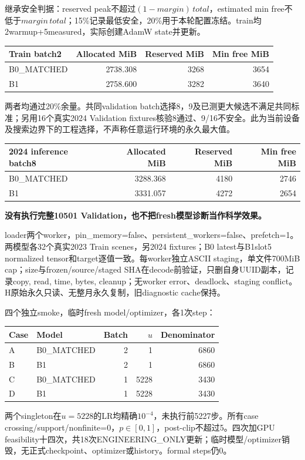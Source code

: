 \documentclass[10pt,a4paper,fontset=windows]{ctexart}
\begin{document}
继承安全判据：reserved peak不超过$(1-margin)\,total$，estimated min free不低于$margin\,total$；15\%记录最低安全，20\%用于本轮配置冻结。train均2warmup+5measured，实际创建AdamW state并更新。
\begin{center}\begin{tabular}{lrrr}\toprule
Train batch2 & Allocated MiB & Reserved MiB & Min free MiB\\\midrule
B0\_MATCHED & 2738.308 & 3268 & 3654 \\
B1 & 2758.600 & 3282 & 3640 \\
\bottomrule\end{tabular}\end{center}
两者均通过20\%余量。共同validation batch选择8，9及已测更大候选不满足共同标准；另用16个真实2024 Validation fixtures核验8通过、9/16不安全。此为当前设备及搜索边界下的工程选择，不声称任意运行环境的永久最大值。
\begin{center}\begin{tabular}{lrrr}\toprule
2024 inference batch8 & Allocated MiB & Reserved MiB & Min free MiB\\\midrule
B0\_MATCHED & 3288.368 & 4180 & 2746 \\
B1 & 3331.057 & 4272 & 2654 \\
\bottomrule\end{tabular}\end{center}
\textbf{没有执行完整10501 Validation，也不把fresh模型诊断当作科学效果。}\par
loader两个worker，pin\_memory=false、persistent\_workers=false、prefetch=1。两模型各32个真实2023 Train scenes，另2024 fixtures；B0 latest与B1slot5 normalized tensor和target逐值一致。每worker独立ASCII staging，单文件700MiB cap；size与frozen/source/staged SHA在decode前验证，只删自身UUID副本，记录copy, read, time, bytes, cleanup；无worker error、deadlock、staging conflict。H原始永久只读、无整月永久复制，旧diagnostic cache保持。

四个独立smoke，临时fresh model/optimizer，各1次step：
\begin{center}\begin{tabular}{llrrr}\toprule
Case & Model & Batch & $u$ & Denominator\\\midrule
A & B0\_MATCHED & 2 & 1 & 6860 \\
B & B1 & 2 & 1 & 6860 \\
C & B0\_MATCHED & 1 & 5228 & 3430 \\
D & B1 & 1 & 5228 & 3430 \\
\bottomrule\end{tabular}\end{center}
两个singleton在$u=5228$的LR均精确$10^{-4}$，未执行前5227步。所有case crossing/support/nonfinite=0，$p\in[0,1]$，post-clip不超过5。四次加GPU feasibility十四次，共18次ENGINEERING\_ONLY更新；临时模型/optimizer销毁，无正式checkpoint、optimizer或history。formal steps仍0。
\end{document}
